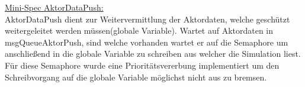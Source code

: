 \underline{Mini-Spec AktorDataPush:}\\
AktorDataPush dient zur Weitervermittlung der Aktordaten, welche geschützt weitergeleitet werden müssen(globale Variable).
Wartet auf Aktordaten in msgQueueAktorPush, sind welche vorhanden wartet er auf die Semaphore um anschließend in die globale Variable zu schreiben aus welcher die Simulation liest. Für diese Semaphore wurde eine Prioritätsvererbung implementiert um den Schreibvorgang auf die globale Variable möglichst nicht aus zu bremsen. \\